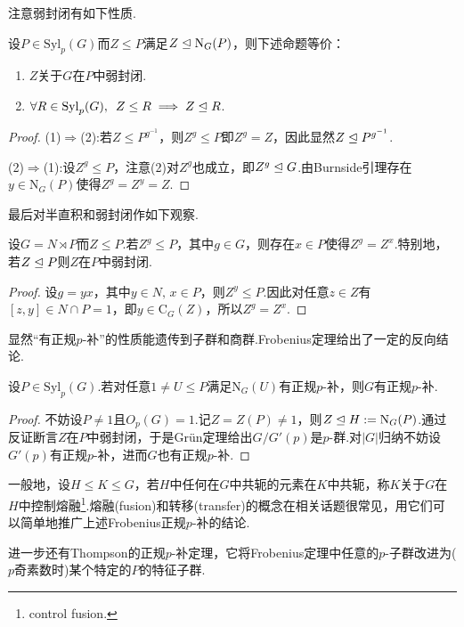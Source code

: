 注意弱封闭有如下性质.
\begin{lemma*}
	设$P\in\mathrm{Syl}_p(G)$而$Z\le P$满足$Z\trianglelefteq\mathrm{N}_G(P)$，则下述命题等价：
	\begin{enumerate}
		\item $Z$关于$G$在$P$中弱封闭.
		\item $\forall R\in\mathrm{Syl}_p(G),\enspace Z\le R\implies Z\trianglelefteq R$.
	\end{enumerate}
\end{lemma*}
\begin{proof}
	\hspace*{5.2pt}(1)$\Rightarrow$(2):若$Z\le P^{g^{-1}}$，则$Z^g\le P$即$Z^g=Z$，因此显然$Z\trianglelefteq P^{g^{-1}}$.

	(2)$\Rightarrow$(1):设$Z^g\le P$，注意(2)对$Z^g$也成立，即$Z^g\trianglelefteq G$.由Burnside引理存在$y\in\mathrm{N}_G(P)$使得$Z^g=Z^y=Z$.
\end{proof}

最后对半直积和弱封闭作如下观察.
\begin{lemma*}
	设$G=N\rtimes P$而$Z\le P$.若$Z^g\le P$，其中$g\in G$，则存在$x\in P$使得$Z^g=Z^x$.特别地，若$Z\trianglelefteq P$则$Z$在$P$中弱封闭.
\end{lemma*}
\begin{proof}
	设$g=yx$，其中$y\in N,\,x\in P$，则$Z^y\le P$.因此对任意$z\in Z$有$[z,y]\in N\cap P=1$，即$y\in\mathrm{C}_G(Z)$，所以$Z^g=Z^x$.
\end{proof}

显然“有正规$p$-补”的性质能遗传到子群和商群.Frobenius定理给出了一定的反向结论.
\begin{thm}[(Frobenius)]
	设$P\in\mathrm{Syl}_p(G)$.若对任意$1\ne U\le P$满足$\mathrm{N}_G(U)$有正规$p$-补，则$G$有正规$p$-补.
\end{thm}
\begin{proof}
	不妨设$P\ne 1$且$O_p(G)=1$.记$Z=Z(P)\ne 1$，则$Z\trianglelefteq H:=\mathrm{N}_G(P)$.通过反证断言$Z$在$P$中弱封闭，于是Gr\"un定理给出$G/G'(p)$是$p$-群.对$|G|$归纳不妨设$G'(p)$有正规$p$-补，进而$G$也有正规$p$-补.
\end{proof}
\begin{remark}
	一般地，设$H\le K\le G$，若$H$中任何在$G$中共轭的元素在$K$中共轭，称$K$关于$G$在$H$中{\heiti 控制熔融}\footnote{control fusion.}.熔融(fusion)和转移(transfer)的概念在相关话题很常见，用它们可以简单地推广上述Frobenius正规$p$-补的结论.
\end{remark}
\begin{remark}
	进一步还有Thompson的正规$p$-补定理，它将Frobenius定理中任意的$p$-子群改进为($p$奇素数时)某个特定的$P$的特征子群.
\end{remark}

